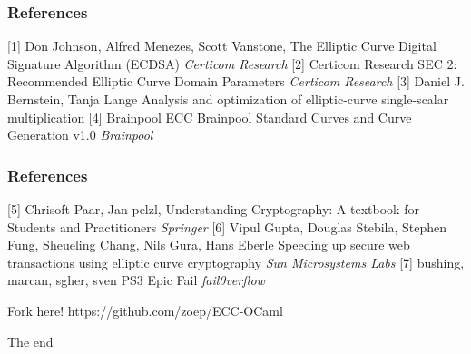 \documentclass{beamer}
\begin{document}
\begin{frame}
\frametitle{References}
\footnotesize{
\begin{thebibliography}{99}
   [1] Don Johnson, Alfred Menezes, Scott Vanstone,
 \newblock The Elliptic Curve Digital Signature Algorithm (ECDSA)
 \newblock \emph{Certicom Research}
   [2] Certicom Research
 \newblock SEC 2: Recommended Elliptic Curve Domain Parameters
 \newblock \emph{Certicom Research}
    [3] Daniel J. Bernstein, Tanja Lange
 \newblock Analysis and optimization of elliptic-curve single-scalar multiplication
   [4] Brainpool
 \newblock ECC Brainpool Standard Curves and Curve Generation v1.0
 \newblock \emph{Brainpool}
\end{thebibliography}
}
\end{frame}
 
\begin{frame}
\frametitle{References}
\footnotesize{
\begin{thebibliography}{99}
   [5] Chrisoft Paar, Jan pelzl,
 \newblock Understanding Cryptography: A textbook for Students and Practitioners
 \newblock \emph{Springer}
    [6] Vipul Gupta, Douglas Stebila, Stephen Fung, Sheueling Chang, Nils Gura, Hans Eberle
 \newblock Speeding up secure web transactions using elliptic curve cryptography
 \newblock \emph{Sun Microsystems Labs}
     [7] bushing, marcan, sgher, sven
 \newblock PS3 Epic Fail
 \newblock \emph{fail0verflow}
\end{thebibliography}
}
\end{frame}

 
\begin{frame}
\begin{block}
{Fork here!}
https://github.com/zoep/ECC-OCaml
\end{block}
\bigskip
\begin{block}
{The end}
\end{block}
\end{frame}
\end{document}
